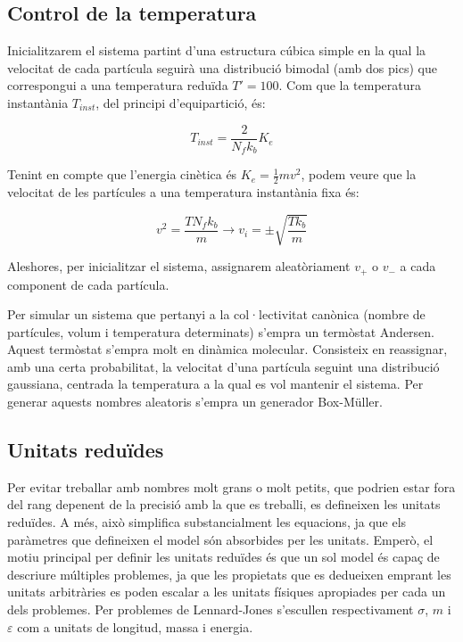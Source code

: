 \documentclass[a4paper,10pt]{article}
\begin{document}
\subsection{Control de la temperatura}
Inicialitzarem el sistema partint d'una estructura cúbica simple en la qual la velocitat de cada partícula seguirà una distribució bimodal (amb dos pics) que correspongui a una temperatura reduïda $T' = 100 $. Com que la temperatura instantània $T_{inst}$, del principi d'equipartició, és:

\begin{equation}
	T_{inst} = \frac{2}{N_f k_b} K_e
\end{equation}

Tenint en compte que l'energia cinètica és $K_e = \frac{1}{2} m v^2$, podem veure que la velocitat de les partícules a una temperatura instantània fixa és:

$$ v^2 = \frac{T N_f k_b}{m} \to v_i = \pm \sqrt{\frac{T k_b}{m}}  $$

Aleshores, per inicialitzar el sistema, assignarem aleatòriament $v_{+}$ o $v_{-}$ a cada component de cada partícula.

Per simular un sistema que pertanyi a la col·lectivitat canònica (nombre de partícules, volum i temperatura determinats) s'empra un termòstat Andersen. Aquest termòstat s'empra molt en dinàmica molecular. Consisteix en reassignar, amb una certa probabilitat, la velocitat d'una partícula seguint una distribució gaussiana, centrada la temperatura a la qual es vol mantenir el sistema. Per generar aquests nombres aleatoris s'empra un generador Box-Müller.

\subsection{Unitats reduïdes}
Per evitar treballar amb nombres molt grans o molt petits, que podrien estar fora del rang depenent de la precisió amb la que es treballi, es defineixen les unitats reduïdes. A més, això simplifica substancialment les equacions, ja que els paràmetres que defineixen el model són absorbides per les unitats. Emperò, el motiu principal per definir les unitats reduïdes és que un sol model és capaç de descriure múltiples problemes, ja que les propietats que es dedueixen emprant les unitats arbitràries es poden escalar a les unitats físiques apropiades per cada un dels problemes. Per problemes de Lennard-Jones s'escullen respectivament $\sigma$, $m$ i $\varepsilon$ com a unitats de longitud, massa i energia.
\end{document}
